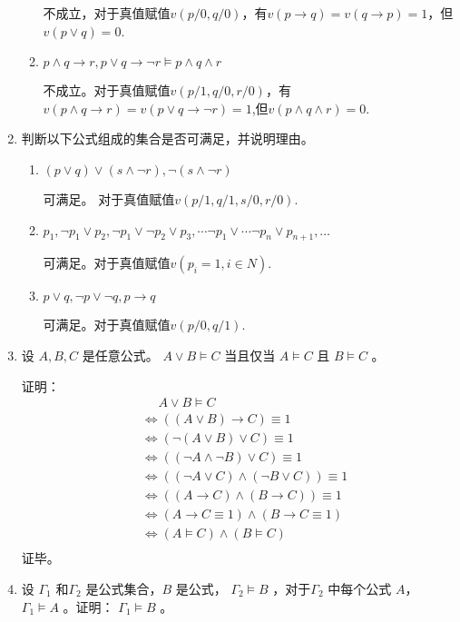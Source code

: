 \documentclass[UTF8]{ctexart}
\begin{document}
\begin{enumerate}
\begin{enumerate}
            不成立，对于真值赋值$v(p/0,q/0)$，有$v(p\rightarrow q)=v(q\rightarrow p)=1$，但$v(p\vee q)=0$.
            
            \item $p \wedge   q\rightarrow  r , p \vee  q\rightarrow  \neg r \models  p \wedge  q \wedge  r $
        
            不成立。对于真值赋值$v(p/1,q/0,r/0)$，有$v(p \wedge q\rightarrow r)=v(p \vee  q\rightarrow  \neg r)=1$,但$v(p\wedge q\wedge r)=0$.

        \end{enumerate}
        
        \item 判断以下公式组成的集合是否可满足，并说明理由。
        \begin{enumerate}
            \item $( p \vee  q) \vee  (s \wedge  \neg r) , \neg (s \wedge \neg r) $
            
            可满足。 对于真值赋值$v(p/1,q/1,s/0,r/0)$.
            
            \item $p_1 , \neg p_1 \vee  p_2 , \neg p_1 \vee  \neg p_2 \vee  p_3 ,\cdots \neg p_1 \vee \cdots \neg p_n \vee  p_{n +1} ,… $
            
            可满足。对于真值赋值$v(p_i=1,i\in N)$.
            
            \item $p \vee  q , \neg p\vee  \neg q , p \rightarrow q $
            
            可满足。对于真值赋值$v(p/0,q/1)$.
        \end{enumerate}

        \item 设 $A,B,C$ 是任意公式。 $A \vee B \models C$ 当且仅当 $A \models C$ 且 $B \models C$ 。
        
        证明：
        \[
            \begin{aligned}
                &\mathrel{\phantom{=}} A \vee B \models C\\
                &\Leftrightarrow ((A\vee B)\rightarrow C )\equiv 1\\
                &\Leftrightarrow (\neg(A \vee B)\vee C)\equiv 1\\
                &\Leftrightarrow ((\neg A \wedge \neg B)\vee C) \equiv 1\\
                &\Leftrightarrow ((\neg A \vee C)\wedge (\neg B \vee C))\equiv 1\\
                &\Leftrightarrow ((A \rightarrow C) \wedge (B\rightarrow C))\equiv 1\\
                &\Leftrightarrow (A\rightarrow C \equiv 1)\wedge (B \rightarrow C\equiv 1)\\
                &\Leftrightarrow (A \models C) \wedge (B\models C)\\
            \end{aligned}
        \]
        证毕。
        \item 设 $\Gamma_1$ 和$\Gamma_2$ 是公式集合，$B$ 是公式， $\Gamma_2 \models   B$ ，对于$\Gamma_2$ 中每个公式 $A$， $\Gamma_1 \models   A$ 。证明： $\Gamma_1 \models   B$ 。
        

\end{enumerate}
\end{document}
